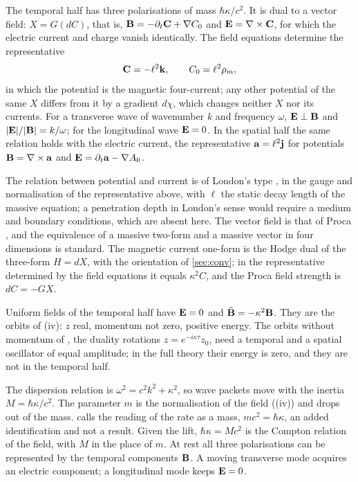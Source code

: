 \begin{proposition}
\label{prop:london}
The temporal half has three polarisations of mass $\hbar\kappa/c^2$. It is dual to a vector field: $X=G(dC)$, that is,
$\mathbf B=-\partial_t\mathbf C+\nabla C_0$ and $\mathbf E=\nabla\times\mathbf C$, for which the electric current and charge vanish identically. The field equations
determine the representative
\[
\mathbf C=-\ell^2\mathbf k,\qquad C_0=\ell^2\rho_m ,
\]
in which the potential is the magnetic four-current; any other potential of the same $X$ differs from it by a gradient $d\chi$, which
changes neither $X$ nor its currents. For a transverse wave of wavenumber $k$ and frequency $\omega$, $\mathbf E\perp\mathbf B$ and
$|\mathbf E|/|\mathbf B|=k/\omega$; for the longitudinal wave $\mathbf E=0$. In the spatial half the same relation holds with the electric current, the
representative $\mathbf a=\ell^2\mathbf j$ for potentials $\mathbf B=\nabla\times\mathbf a$ and $\mathbf E=\partial_t\mathbf a-\nabla A_0$.
\end{proposition}

The relation between potential and current is of London's type \cite{London35}, in the gauge and normalisation of the representative
above, with $\ell$ the static decay length of the massive equation; a penetration depth in London's sense would require a medium and boundary conditions, which are absent here. The vector field is
that of Proca \cite{Proca36}, and the equivalence of a massive two-form and a massive vector in four dimensions is standard. The magnetic
current one-form is the Hodge dual of the three-form $H=dX$, with the orientation of \cref{sec:conv}; in the representative determined by
the field equations it equals $\kappa^2C$, and the Proca field strength is $dC=-GX$.

\begin{proposition}
\label{prop:rest}
Uniform fields of the temporal half have $\mathbf E=0$ and $\ddot{\mathbf B}=-\kappa^2\mathbf B$. They are the orbits of (iv): $z$ real,
momentum not zero, positive energy. The orbits without momentum of , the duality rotations $z=e^{-i\kappa\tau}z_0$, need a
temporal and a spatial oscillator of equal amplitude; in the full theory their energy is zero, and they are not in the temporal half.
\end{proposition}

\begin{remark}[Mass]
\label{rem:mass}
The dispersion relation is $\omega^2=c^2k^2+\kappa^2$, so wave packets move with the inertia $M=\hbar\kappa/c^2$. The parameter $m$ is the
normalisation of the field ((iv)) and drops out of the mass.  calls the reading of the rate as a mass,
$mc^2=\hbar\kappa$, an added identification and not a result. Given the lift, $\hbar\kappa=Mc^2$ is the Compton relation of the field, with
$M$ in the place of $m$. At rest all three polarisations can be represented by the temporal components $\mathbf B$. A moving transverse mode acquires an electric
component; a longitudinal mode keeps $\mathbf E=0$.
\end{remark}

